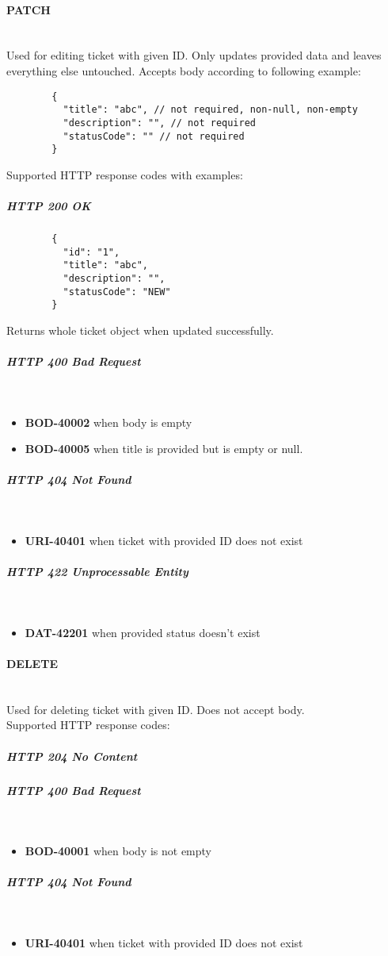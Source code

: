 \documentclass[a4paper]{article}
\newcommand{\newLineParagraph}[1]{\paragraph{#1}\mbox{}\\}
\newcommand{\newLineSubParagraph}[1]{\subparagraph{#1}\mbox{}\\}
\begin{document}
    \newLineParagraph{PATCH}
    Used for editing ticket with given ID. Only updates provided data and leaves everything else untouched. Accepts body according to following example:
    \begin{verbatim}
        {
          "title": "abc", // not required, non-null, non-empty
          "description": "", // not required
          "statusCode": "" // not required
        }
    \end{verbatim}
    Supported HTTP response codes with examples:
    \subparagraph{HTTP 200 OK}
    \begin{verbatim}
        {
          "id": "1",
          "title": "abc",
          "description": "",
          "statusCode": "NEW"
        }
    \end{verbatim}
    Returns whole ticket object when updated successfully.
    \newLineSubParagraph{HTTP 400 Bad Request}
    \begin{itemize}
        \item \textbf{BOD-40002} when body is empty
        \item \textbf{BOD-40005} when title is provided but is empty or null.
    \end{itemize}
    \newLineSubParagraph{HTTP 404 Not Found}
    \begin{itemize}
        \item \textbf{URI-40401} when ticket with provided ID does not exist
    \end{itemize}
    \newLineSubParagraph{HTTP 422 Unprocessable Entity}
    \begin{itemize}
        \item \textbf{DAT-42201} when provided status doesn't exist
    \end{itemize}

    \newLineParagraph{DELETE}
    Used for deleting ticket with given ID. Does not accept body. \\
    Supported HTTP response codes:
    \subparagraph{HTTP 204 No Content}
    \newLineSubParagraph{HTTP 400 Bad Request}
    \begin{itemize}
        \item \textbf{BOD-40001} when body is not empty
    \end{itemize}
    \newLineSubParagraph{HTTP 404 Not Found}
    \begin{itemize}
        \item \textbf{URI-40401} when ticket with provided ID does not exist
    \end{itemize}
\end{document}
